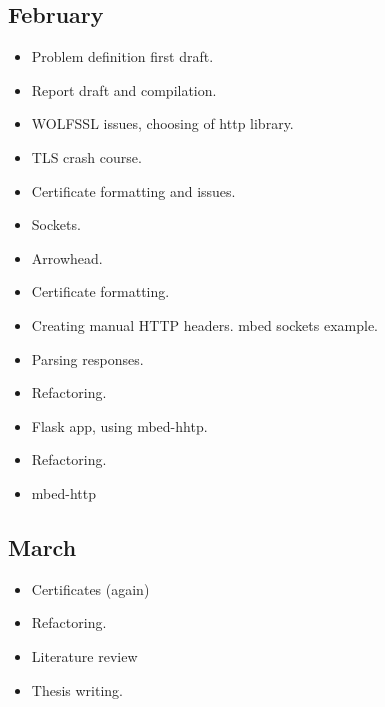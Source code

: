 \subsection{February}

\begin{itemize}
       \item Problem definition first draft. 
       \item Report draft and compilation.
       \item WOLFSSL issues, choosing of http library.
       \item TLS crash course.
       \item Certificate formatting and issues.
       \item Sockets.
       \item Arrowhead.
       \item Certificate formatting.
       \item Creating manual HTTP headers. mbed sockets example.
       \item Parsing responses.
       \item Refactoring.
       \item Flask app, using mbed-hhtp.
       \item Refactoring.
       \item mbed-http
\end{itemize}

\subsection{March}

\begin{itemize}
       \item Certificates (again)
       \item Refactoring.
       \item Literature review
       \item Thesis writing.
\end{itemize}